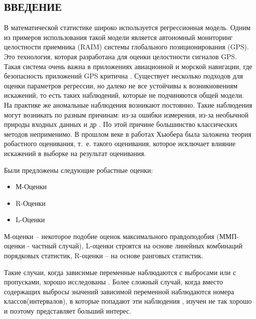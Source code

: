 \begin{center}
    \section*{ВВЕДЕНИЕ}
\end{center}
{}

В математической статистике широко используется регрессионная модель. 
Одним из примеров использования такой модели является автономный мониторинг целостности приемника (RAIM) системы глобального позиционирования (GPS). 
Это технология, которая разработана для оценки целостности сигналов GPS. 
Такая система очень важна в приложениях авиационной и морской навигации, где безопасность приложений GPS критична \cite{GPS_POSITIONING}.
Существует несколько подходов для оценки параметров регрессии, но далеко не все устойчивы к возникновениям искажений, 
то есть таких наблюдений, которые не подчиняются общей модели. 
На практике же аномальные наблюдения возникают постоянно. 
Такие наблюдения могут возникать по разным причинам: из-за ошибки измерения, из-за необычной природы входных данных и др \cite{OLSforGrouping}.
По этой причине большинство классических методов неприменимо.
В прошлом веке в работах Хьюбера была заложена теория робастного оценивания, т.~е. такого оценивания, которое исключает влияние искажений в выборке на результат оценивания.

Были предложены следующие робастные оценки\cite{Huber}:
\begin{itemize}
    \item М-Оценки
    \item R-Оценки
    \item L-Оценки
\end{itemize}
М-оценки -- некоторое подобие оценок максимального правдоподобия (ММП-оценки - частный случай), L-оценки строятся на основе линейных комбинаций порядковых статистик, R-оценки -- на основе ранговых статистик.

Такие случаи, когда зависимые переменные наблюдаются с выбросами или с пропусками, хорошо исследованы \cite{OLSforGrouping}. 
Более сложный случай, когда вместо содержащих выбросы значений зависимой переменной наблюдаются номера классов(интервалов), в которые попадают эти наблюдения \cite{technometrics}, изучен не так хорошо и поэтому представляет больший интерес.
